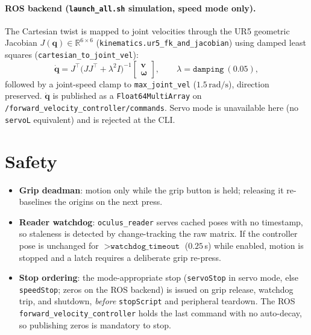 \documentclass[11pt]{article}
\newcommand{\R}{\mathbb{R}}
\newcommand{\vv}{\bm{v}}
\newcommand{\vw}{\bm{\omega}}
\begin{document}
\paragraph{ROS backend (\texttt{launch\_all.sh} simulation, speed mode only).}
The Cartesian twist is mapped to joint velocities through the UR5 geometric
Jacobian $J(\bm{q})\in\R^{6\times6}$ (\texttt{kinematics.ur5\_fk\_and\_jacobian})
using damped least squares (\texttt{cartesian\_to\_joint\_vel}):
\begin{equation}
  \dot{\bm{q}} = J^{\top}\big(JJ^{\top} + \lambda^2 I\big)^{-1}
                 \begin{bmatrix}\vv\\\vw\end{bmatrix},
  \qquad \lambda=\texttt{damping}\ (0.05),
\end{equation}
followed by a joint-speed clamp to \texttt{max\_joint\_vel} ($1.5\,\mathrm{rad/s}$),
direction preserved. $\dot{\bm{q}}$ is published as a
\texttt{Float64MultiArray} on \texttt{/forward\_velocity\_controller/commands}.
Servo mode is unavailable here (no \texttt{servoL} equivalent) and is rejected
at the CLI.

\section{Safety}
\begin{itemize}[leftmargin=1.5em]
  \item \textbf{Grip deadman}: motion only while the grip button is held;
        releasing it re-baselines the origins on the next press.
  \item \textbf{Reader watchdog}: \texttt{oculus\_reader} serves cached poses
        with no timestamp, so staleness is detected by change-tracking the raw
        matrix. If the controller pose is unchanged for
        $>\texttt{watchdog\_timeout}$ ($0.25\,$s) while enabled, motion is
        stopped and a latch requires a deliberate grip re-press.
  \item \textbf{Stop ordering}: the mode-appropriate stop
        (\texttt{servoStop} in servo mode, else \texttt{speedStop}; zeros on
        the ROS backend) is issued on grip release, watchdog trip, and
        shutdown, \emph{before} \texttt{stopScript} and peripheral teardown.
        The ROS \texttt{forward\_velocity\_controller} holds the last command
        with no auto-decay, so publishing zeros is mandatory to stop.
\end{itemize}
\end{document}
